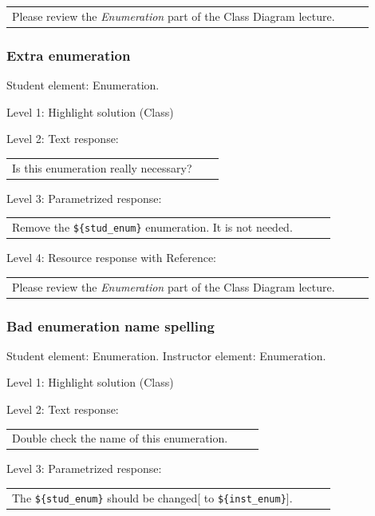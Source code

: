 \begin{tabular}{|p{0.9\linewidth}}
Please review the \textit{Enumeration} part of the Class Diagram lecture.
\end{tabular} \medskip


\subsubsection{Extra enumeration}

Student element: Enumeration.  \medskip

\noindent Level 1: Highlight solution (Class) \medskip

\noindent Level 2: Text response: \medskip

\begin{tabular}{|p{0.9\linewidth}}
Is this enumeration really necessary?
\end{tabular} \medskip

\noindent Level 3: Parametrized response: \medskip

\begin{tabular}{|p{0.9\linewidth}}
Remove the \verb|${stud_enum}| enumeration. It is not needed.
\end{tabular} \medskip

\noindent Level 4: Resource response with Reference: \medskip

\begin{tabular}{|p{0.9\linewidth}}
Please review the \textit{Enumeration} part of the Class Diagram lecture.
\end{tabular} \medskip


\subsubsection{Bad enumeration name spelling}

Student element: Enumeration. Instructor element: Enumeration. \medskip

\noindent Level 1: Highlight solution (Class) \medskip

\noindent Level 2: Text response: \medskip

\begin{tabular}{|p{0.9\linewidth}}
Double check the name of this enumeration.
\end{tabular} \medskip

\noindent Level 3: Parametrized response: \medskip

\begin{tabular}{|p{0.9\linewidth}}
The \verb|${stud_enum}| should be changed[ to \verb|${inst_enum}|].
\end{tabular} \medskip

